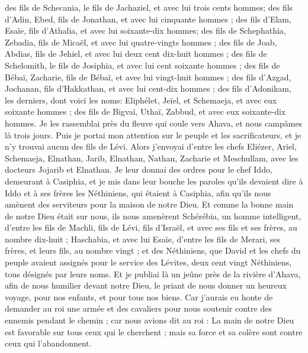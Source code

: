 \begin{multicols}{2}
des fils de Schecania, le fils de Jachaziel, et avec lui trois cents hommes;
des fils d'Adin, Ebed, fils de Jonathan, et avec lui cinquante hommes ;
des fils d'Elam, Esaïe, fils d'Athalia, et avec lui soixante-dix hommes;
des fils de Schephathia, Zebadia, fils de Micaël, et avec lui quatre-vingts hommes ;
des fils de Joab, Abdias, fils de Jehiel, et avec lui deux cent dix-huit hommes ;
des fils de Schelomith, le fils de Josiphia, et avec lui cent soixante hommes ;
des fils de Bébaï, Zacharie, fils de Bébaï, et avec lui vingt-huit hommes ;
des fils d'Azgad, Jochanan, fils d'Hakkathan, et avec lui cent-dix hommes ;
des fils d'Adonikam, les derniers, dont voici les noms: Eliphélet, Jeïel, et Schemaeja, et avec eux soixante hommes ;
des fils de Bigvaï, Uthaï, Zabbud, et avec eux soixante-dix hommes.
Je les rassemblai près du fleuve qui coule vers Ahava, et nous campâmes là trois jours. Puis je portai mon attention sur  le peuple et les sacrificateurs, et je n'y trouvai aucun des fils de Lévi.
Alors j'envoyai d'entre les chefs Eliézer, Ariel, Schemaeja, Elnathan, Jarib, Elnathan, Nathan, Zacharie et Meschullam, avec les docteurs Jojarib et Elnathan.
Je leur donnai des ordres pour le chef Iddo, demeurant à Casiphia, et je mis dans leur bouche les paroles qu'ils devaient dire à Iddo et à ses frères les Néthiniens, qui étaient à Casiphia, afin qu'ils nous amènent des serviteurs pour la maison de notre Dieu.
Et comme la bonne main de notre Dieu était sur nous, ils nous amenèrent Schérébia, un homme intelligent, d'entre les fils de Machli, fils de Lévi, fils d'Israël, et avec ses fils et ses frères, au nombre dix-huit ;
Haschabia, et avec lui Esaïe, d'entre les fils de Merari, ses frères, et leurs fils, au nombre vingt ;
et des Néthiniens, que David et les chefs du peuple avaient assignés pour le service des Lévites, deux cent vingt Néthiniens, tous désignés par leurs noms.
Et je publiai là un jeûne près de la rivière d'Ahava, afin de nous humilier devant notre Dieu, le priant de nous donner un heureux voyage, pour nos enfants, et pour tous nos biens.
Car j'aurais eu honte de demander au roi une armée et des cavaliers pour nous soutenir contre des ennemis pendant le chemin ; car nous avions dit au roi : La main de notre Dieu est favorable sur tous ceux qui le cherchent ; mais sa force et sa colère sont contre ceux qui l'abandonnent.

\end{multicols}
